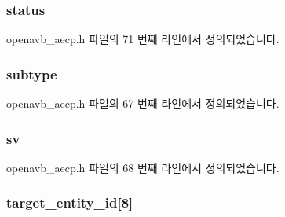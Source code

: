 \subsubsection[{\texorpdfstring{status}{status}}]{ status}\hypertarget{structopenavb__aecp__control__header__t_aa2ef32d18f7a5a009b93a17834fe3828}{}\label{structopenavb__aecp__control__header__t_aa2ef32d18f7a5a009b93a17834fe3828}


openavb\+\_\+aecp.\+h 파일의 71 번째 라인에서 정의되었습니다.

\subsubsection[{\texorpdfstring{subtype}{subtype}}]{ subtype}\hypertarget{structopenavb__aecp__control__header__t_ad61c2796f8f447c2ca8979f4aeccf351}{}\label{structopenavb__aecp__control__header__t_ad61c2796f8f447c2ca8979f4aeccf351}


openavb\+\_\+aecp.\+h 파일의 67 번째 라인에서 정의되었습니다.

\subsubsection[{\texorpdfstring{sv}{sv}}]{ sv}\hypertarget{structopenavb__aecp__control__header__t_adc62d14194c9ab3aff5b994caef8bcb0}{}\label{structopenavb__aecp__control__header__t_adc62d14194c9ab3aff5b994caef8bcb0}


openavb\+\_\+aecp.\+h 파일의 68 번째 라인에서 정의되었습니다.

\subsubsection[{\texorpdfstring{target\+\_\+entity\+\_\+id}{target_entity_id}}]{ target\+\_\+entity\+\_\+id\mbox{[}8\mbox{]}}\hypertarget{structopenavb__aecp__control__header__t_ae1b176653a5c7930b960fd063409cf37}{}\label{structopenavb__aecp__control__header__t_ae1b176653a5c7930b960fd063409cf37}


